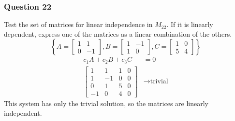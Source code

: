 \documentclass{math}
\begin{document}
\subsubsection*{Question 22}
Test the set of matrices for linear independence in \( M_{22} \). If it is
linearly dependent, express one of the matrices as a linear combination of the
others.
\[ \left\{A = \begin{bmatrix}1 & 1 \\ 0 & -1\end{bmatrix},
  B = \begin{bmatrix}1 & -1 \\ 1 & 0\end{bmatrix},
  C = \begin{bmatrix}1 & 0 \\ 5 & 4\end{bmatrix}\right\} \]
\begin{align*}
  c_1A+c_2B+c_3C &= 0 \\
  \left[\begin{array}{ccc|c}
    1 & 1 & 1 & 0 \\
    1 & -1 & 0 & 0 \\
    0 & 1 & 5 & 0 \\
    -1 & 0 & 4 & 0
  \end{array}\right] &\to \text{trivial}
\end{align*}
This system has only the trivial solution, so the matrices are linearly
independent.
\end{document}
